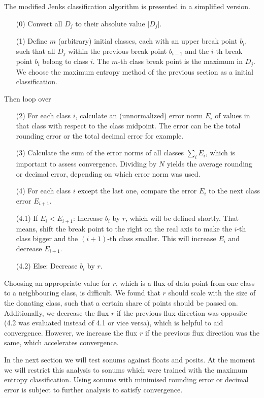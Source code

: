 The modified Jenks classification algorithm is presented in a simplified version.
\begin{itemize}
    \item[(0)] Convert all $D_j$ to their absolute value $\vert D_j \vert$.
    \item[(1)] Define $m$ (arbitrary) initial classes, each with an upper break point $b_i$, such that all $D_j$ within the previous break point $b_{i-1}$ and the $i$-th break point $b_i$ belong to class $i$. The $m$-th class break point is the maximum in $D_j$. We choose the maximum entropy method of the previous section as a initial classification.
\end{itemize}
Then loop over
\begin{itemize}
    \item[(2)] For each class $i$, calculate an (unnormalized) error norm $E_i$ of values in that class with respect to the class midpoint. The error can be the total rounding error or the total decimal error for example.
    \item[(3)] Calculate the sum of the error norms of all classes $\sum_i E_i$, which is important to assess convergence. Dividing by $N$ yields the average rounding or decimal error, depending on which error norm was used.
    \item[(4)] For each class $i$ except the last one, compare the error $E_i$ to the next class error $E_{i+1}$.
    \item[(4.1)] If $E_i < E_{i+1}$: Increase $b_i$ by $r$, which will be defined shortly. That means, shift the break point to the right on the real axis to make the $i$-th class bigger and the $(i+1)$-th class smaller. This will increase $E_i$ and decrease $E_{i+1}$.
    \item[(4.2)] Else: Decrease $b_i$ by $r$.
\end{itemize}
Choosing an appropriate value for $r$, which is a flux of data point from one class to a neighbouring class, is difficult. We found that $r$ should scale with the size of the donating class, such that a certain share of points should be passed on. Additionally, we decrease the flux $r$ if the previous flux direction was opposite (4.2 was evaluated instead of 4.1 or vice versa), which is helpful to aid convergence. However, we increase the flux $r$ if the previous flux direction was the same, which accelerates convergence.

In the next section we will test sonums against floats and posits. At the moment we will restrict this analysis to sonums which were trained with the maximum entropy classification. Using sonums with minimised rounding error or decimal error is subject to further analysis to satisfy convergence.

